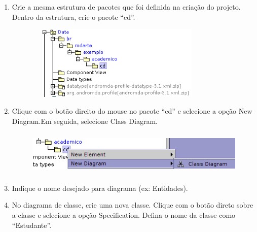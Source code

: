 \begin{enumerate}
\item Crie a mesma estrutura de pacotes que foi definida na criação do projeto.
Dentro da estrutura, crie o pacote “cd”.
\begin{figure}[!htb]
	\centering
	\includegraphics[width=250pt,height=100pt]{imgs/tutorial-mdarte-0000.png}
\end{figure}
\item Clique com o botão direito do mouse no pacote “cd” e selecione a opção New
Diagram.Em seguida, selecione Class Diagram.
\begin{figure}[!htb]
	\centering
	\includegraphics[width=400pt,height=60pt]{imgs/tutorial-mdarte-0001.png}
\end{figure}
	
\item Indique o nome desejado para diagrama (ex: Entidades).
	
\item No diagrama de classe, crie uma nova classe. Clique com o botão direto
sobre a classe e selecione a opção Specification. Defina o nome da classe como
“Estudante”.
	

\end{enumerate}
